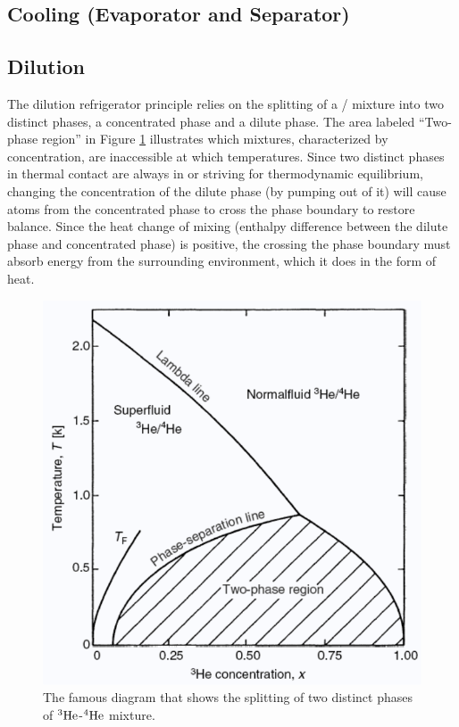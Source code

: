 \subsection{\hef{}Cooling (Evaporator and Separator)}

\subsection{Dilution}

The dilution refrigerator principle relies on the splitting of a \het/\hef{} mixture into two distinct phases, a \het{} concentrated phase and a \het{} dilute phase.  The area labeled ``Two-phase region'' in Figure \ref{fig:dilutiondiagram} illustrates which mixtures, characterized by \het{} concentration, are inaccessible at which temperatures.  Since two distinct phases in thermal contact are always in or striving for thermodynamic equilibrium, changing the concentration of the dilute phase (by pumping \het{} out of it) will cause atoms from the concentrated phase to cross the phase boundary to restore balance.  Since the heat change of mixing (enthalpy difference between the dilute phase and concentrated phase) is positive, the \het{} crossing the phase boundary must absorb energy from the surrounding environment, which it does in the form of heat.\cite{hocktechniques}

\begin{figure}
 \centering
 \includegraphics[scale=.45]{img/dilutiondiagram.png}
 \caption{The famous diagram that shows the splitting of two distinct phases of $^3\textrm{He}$-$^4\textrm{He}$ mixture. \cite{dilutiondiagram}}
 \label{fig:dilutiondiagram}
\end{figure}
 
